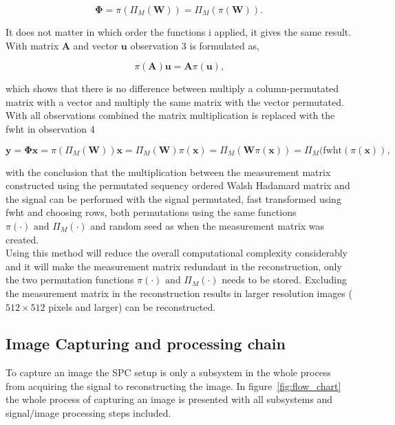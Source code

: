 \begin{equation}
\mathbf{\Phi} = \pi(\Pi_M(\mathbf{W})) = \Pi_M(\pi(\mathbf{W}))\text{.}
\end{equation}

It does not matter in which order the functions i applied, it gives the same result. With matrix $\mathbf{A}$ and vector $\mathbf{u}$ observation 3 is formulated as,

\begin{equation}
\pi(\mathbf{A})\mathbf{u} = \mathbf{A}\pi(\mathbf{u})\text{,}
\end{equation}

which shows that there is no difference between multiply a column-permutated matrix with a vector and multiply the same matrix with the vector permutated.\\[0.1in]

With all observations combined the matrix multiplication is replaced with the fwht in observation 4

\begin{equation}
\mathbf{y} = \mathbf{\Phi}\mathbf{x} = \pi(\Pi_M(\mathbf{W}))\mathbf{x} = \Pi_M(\mathbf{W})\pi(\mathbf{x}) = \Pi_M(\mathbf{W}\pi(\mathbf{x})) = \Pi_M(\text{fwht}(\pi(\mathbf{x}))\text{,}
\end{equation}

with the conclusion that the multiplication between the measurement matrix constructed using the permutated sequency ordered Walsh Hadamard matrix and the signal can be performed with the signal permutated, fast transformed using fwht and choosing rows, both permutations using the same functions $\pi(\cdot) \text{ and } \Pi_M(\cdot)$ and random seed as when the measurement matrix was created.\\[0.1in]

Using this method will reduce the overall computational complexity considerably and it will make the measurement matrix redundant in the reconstruction, only the two permutation functions $\pi(\cdot) \text{ and } \Pi_M(\cdot)$ needs to be stored. Excluding the measurement matrix in the reconstruction results in larger resolution images ($512\times512$ pixels and larger) can be reconstructed. \cite{article:SRM_long, article:TVAL3}



\subsection{Image Capturing and processing chain}
To capture an image the SPC setup is only a subsystem in the whole process from acquiring the signal to reconstructing the image. In figure~\ref{fig:flow_chart} the whole process of capturing an image is presented with all subsystems and signal/image processing steps included.

